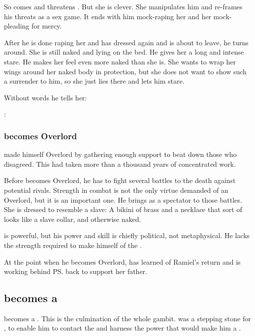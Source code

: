 So \Dasteron{} comes and threatens \Cishiel. 
But she is clever. 
She manipulates him and re-frames his threats as a sex game. 
It ends with him mock-raping her and her mock-pleading for mercy. 

After he is done raping her and has dressed again and is about to leave, he turns around. 
She is still naked and lying on the bed. 
He gives her a long and intense stare. 
He makes her feel even more naked than she is. 
She wants to wrap her wings around her naked body in protection, but she does not want to show such a surrender to him, so she just lies there and lets him stare. 

Without words he tells her: 
\begin{prose}
  \Dasteron: 
\end{prose}





\subsubsection{\Dasteron{} becomes Overlord}
\Dasteron{} made himself Overlord by gathering enough support to beat down those who disagreed. 
This had taken more than a thousand years of concentrated work. 

Before \Dasteron becomes Overlord, he has to fight several battles to the death against potential rivals.
Strength in combat is not the only virtue demanded of an Overlord, but it is an important one.
He brings \Cishiel as a spectator to those battles. 
She is dressed to resemble a slave: 
A bikini of brass and a necklace that sort of looks like a slave collar, and otherwise naked.

\Dasteron is powerful, but his power and skill is chiefly political, not metaphysical. 
He lacks the \vertex{} strength required to make himself \apex{} of the \Mystraacht{} \matrix. 

At the point when he becomes Overlord, \Cishiel{} has learned of Ramiel's return and is working behind \ps{\Dasteron} back to support her father. 









\subsection{\Vizsherioch{} becomes a \shaeeroth}
\Vizsherioch{} becomes a \shaeeroth.
This is the culmination of the whole \Nithdornazsh{} gambit. 
\Nithdornazsh{} was a stepping stone for \Vizsherioch, to enable him to contact the \xss{} and harness the power that would make him a \shaeeroth.


